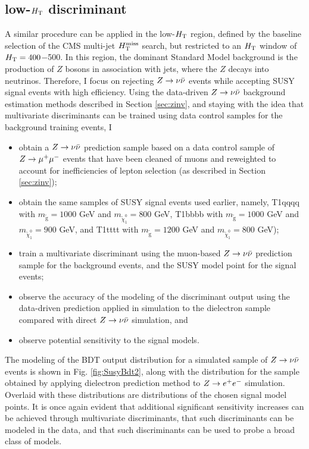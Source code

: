 \subsection{low-$\Ht$ discriminant}
A similar procedure can be applied in the low-$\Ht$ region, defined by the baseline selection of the CMS multi-jet $\mht$ search, but restricted to an $\Ht$ window of $\Ht=400$$-$500. In this region, the dominant Standard Model background is the production of $Z$ bosons in association with jets, where the $Z$ decays into neutrinos. Therefore, I focus on rejecting $\zinv$ events while accepting SUSY signal events with high efficiency. Using the data-driven $\zinv$ background estimation methods described in Section \ref{sec:zinv}, and staying with the idea that multivariate discriminants can be trained using data control samples for the background training events, I
\begin{itemize}
\item obtain a $\zinv$ prediction sample based on a data control sample of $\zmumu$ events that have been cleaned of muons and reweighted to account for inefficiencies of lepton selection (as described in Section \ref{sec:zinv});
\item obtain the same samples of SUSY signal events used earlier, namely, T1qqqq with $m_{\tilde{\text{g}}}=1000$ GeV and $m_{\tilde{\chi}^{0}_{1}}=800$ GeV,  T1bbbb with $m_{\tilde{\text{g}}}=1000$ GeV and $m_{\tilde{\chi}^{0}_{1}}=900$ GeV, and T1tttt with $m_{\tilde{\text{g}}}=1200$ GeV and $m_{\tilde{\chi}^{0}_{1}}=800$ GeV);
\item train a multivariate discriminant using the muon-based $\zinv$ prediction sample for the background events, and the  SUSY model point for the signal events;
\item observe the accuracy of the modeling of the discriminant output using the data-driven prediction applied in simulation to the dielectron sample compared with direct $\zinv$ simulation, and
\item observe potential sensitivity to the signal models.
\end{itemize}
The modeling of the BDT output distribution for a simulated sample of $\zinv$ events is shown in Fig. \ref{fig:SusyBdt2}, along with the distribution for the sample obtained by applying dielectron prediction method to $\zee$ simulation. Overlaid with these distributions are distributions of the chosen signal model points. It is once again evident that additional significant sensitivity increases can be achieved through multivariate discriminants, that such discriminants can be modeled in the data, and that such discriminants can be used to probe a broad class of models.
$$
